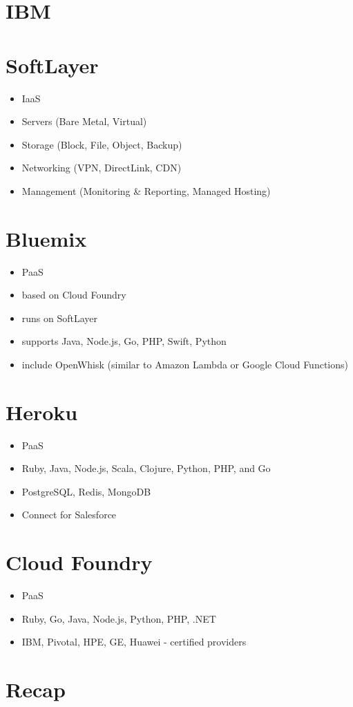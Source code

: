 \documentclass[presentation]{beamer}
\begin{document}
\section*{IBM}
\label{sec:orgcd8c14e}
\section*{SoftLayer}
\label{sec:orge60e47e}
\begin{itemize}
\item IaaS
\item Servers (Bare Metal, Virtual)
\item Storage (Block, File, Object, Backup)
\item Networking (VPN, DirectLink, CDN)
\item Management (Monitoring \& Reporting, Managed Hosting)
\end{itemize}
\section*{Bluemix}
\label{sec:org86e004e}
\begin{itemize}
\item PaaS
\item based on Cloud Foundry
\item runs on SoftLayer
\item supports Java, Node.js, Go, PHP, Swift, Python
\item include OpenWhisk (similar to Amazon Lambda or Google Cloud Functions)
\end{itemize}
\section*{Heroku}
\label{sec:org7ba6275}
\begin{itemize}
\item PaaS
\item Ruby, Java, Node.js, Scala, Clojure, Python, PHP, and Go
\item PostgreSQL, Redis, MongoDB
\item Connect for Salesforce
\end{itemize}
\section*{Cloud Foundry}
\label{sec:org27066f2}
\begin{itemize}
\item PaaS
\item Ruby, Go, Java, Node.js, Python, PHP, .NET
\item IBM, Pivotal, HPE, GE, Huawei - certified providers
\end{itemize}
\section*{Recap}
\label{sec:orgd38e158}
\end{document}
